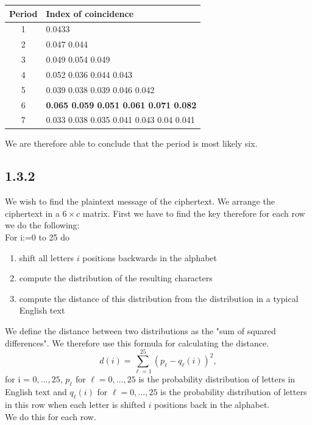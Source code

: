 \documentclass[11pt]{report}
\begin{document}
\begin{center}
\begin{tabular}{| c l |}
\hline
Period & Index of coincidence\\ \hline
1 & 0.0433\\
2 & 0.047 0.044\\
3 & 0.049 0.054 0.049\\
4 & 0.052 0.036 0.044 0.043\\
5 & 0.039 0.038 0.039 0.046 0.042\\
6 & \textbf{0.065 0.059 0.051 0.061 0.071 0.082}\\
7 & 0.033 0.038 0.035 0.041 0.043 0.04 0.041\\
\hline
\end{tabular}
\end{center}

We are therefore able to conclude that the period is most likely six.

\subsection*{1.3.2}
We wish to find the plaintext message of the ciphertext. We arrange the ciphertext in a $6 \times c$ matrix. First we have to find the key therefore for each row we do the following:\\
For i:=0 to 25 do
\begin{enumerate}
\item shift all letters $i$ positions backwards in the alphabet
\item compute the distribution of the resulting characters
\item compute the distance of this distribution from the distribution in a typical English text
\end{enumerate}
We define the distance between two distributions as the "sum of squared differences". We therefore use this formula for calculating the distance.\\
$$d(i) = \sum_{\ell=1}^{25} (p_{\ell} - q_{\ell}(i))^2,$$
for i = $0,\dots,25$, $p_{\ell}$ for $\ell = 0,\dots,25$ is the probability distribution of letters in English text and $q_{\ell}(i)$ for $\ell = 0,\dots,25$ is the probability distribution of letters in this row when each letter is shifted $i$ positions back in the alphabet.\\
We do this for each row.
\end{document}
